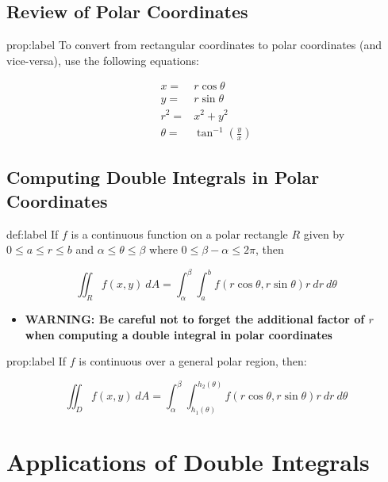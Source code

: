 \documentclass{package/notes}
\begin{document}
\subsection{Review of Polar Coordinates}

\begin{proposition}{prop:label}
	To convert from rectangular coordinates to polar coordinates (and vice-versa), use the following equations:

	$$
	\begin{aligned}
		x =& r\cos\theta\\
		y=&r\sin\theta\\
		r^2=&x^2+y^2\\
		\theta =& \tan^{-1}\left(\frac{y}{x}\right)	
	\end{aligned}
	$$
\end{proposition}


\subsection{Computing Double Integrals in Polar Coordinates}

\begin{definition}{def:label}
	If $f$ is a continuous function on a polar rectangle $R$ given by $0\le a\le r\le b$ and $\alpha\le\theta\le\beta$ where $0\le\beta-\alpha\le2\pi$, then

	$$\iint_Rf(x,y)\:dA=\int_\alpha^\beta\int_a^bf(r\cos\theta, r\sin\theta)r\:dr\:d\theta$$
\end{definition}

\begin{itemize}
	\item \textbf{WARNING: Be careful not to forget the additional factor of $r$ when computing a double integral in polar coordinates}
\end{itemize}

\begin{definition}{prop:label}
	If $f$ is continuous over a general polar region, then:

	$$\iint_Df(x,y)\:dA =\int_\alpha^\beta\int_{h_1(\theta)}^{h_2(\theta)}f(r\cos\theta, r\sin\theta)r\:dr\:d\theta$$
\end{definition}



\section{Applications of Double Integrals}
\end{document}
